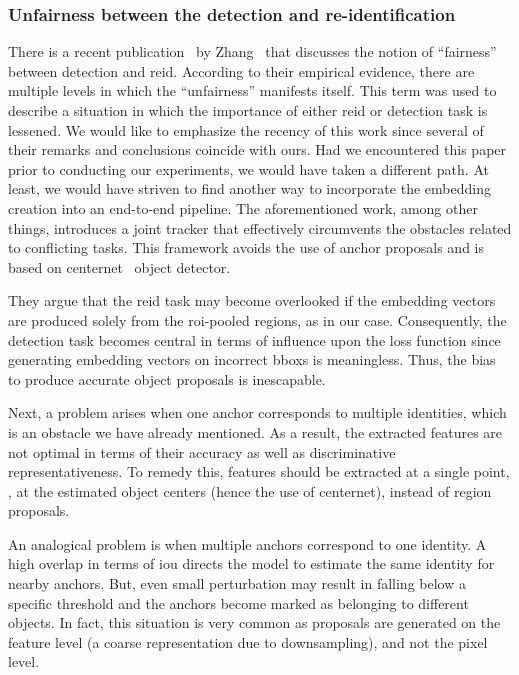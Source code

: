 \subsubsection{Unfairness between the detection and re-identification}

There is a recent publication~\cite{zhang2021fairmot} by Zhang~\etal{} that discusses the notion of ``fairness'' between detection and \gls{reid}. According to their empirical evidence, there are multiple levels in which the ``unfairness'' manifests itself. This term was used to describe a situation in which the importance of either \gls{reid} or detection task is lessened. We would like to emphasize the recency of this work since several of their remarks and conclusions coincide with ours. Had we encountered this paper prior to conducting our experiments, we would have taken a different path. At least, we would have striven to find another way to incorporate the embedding creation into an end-to-end pipeline. The aforementioned work, among other things, introduces a joint tracker that effectively circumvents the obstacles related to conflicting tasks. This framework avoids the use of anchor proposals and is based on \gls{centernet}~\cite{zhou2019centernet} object detector.

They argue that the \gls{reid} task may become overlooked if the embedding vectors are produced solely from the \gls{roi}-pooled regions, as in our case. Consequently, the detection task becomes central in terms of influence upon the loss function since generating embedding vectors on incorrect \glspl{bbox} is meaningless. Thus, the bias to produce accurate object proposals is inescapable.

Next, a problem arises when one anchor corresponds to multiple identities, which is an obstacle we have already mentioned. As a result, the extracted features are not optimal in terms of their accuracy as well as discriminative representativeness. To remedy this, features should be extracted at a single point, \ietext{}, at the estimated object centers (hence the use of \gls{centernet}), instead of region proposals.

An analogical problem is when multiple anchors correspond to one identity. A high overlap in terms of \gls{iou} directs the model to estimate the same identity for nearby anchors. But, even small perturbation may result in falling below a specific threshold and the anchors become marked as belonging to different objects. In fact, this situation is very common as proposals are generated on the feature level (a coarse representation due to downsampling), and not the pixel level.

